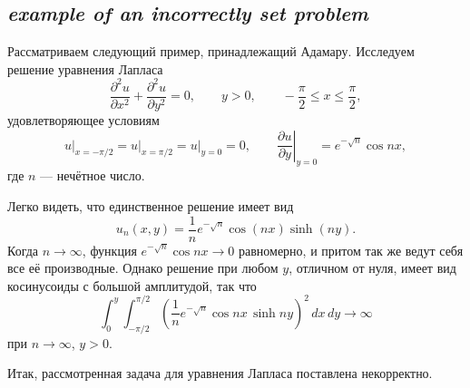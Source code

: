 \subsection*{ \textit{example of an incorrectly set problem}}
\begin{rusblock}
Рассматриваем следующий пример, принадлежащий Адамару. Исследуем решение уравнения Лапласа
\[
\frac{\partial^2u}{\partial x^2}+\frac{\partial^2u}{\partial y^2}=0,
\qquad y>0,
\qquad -\frac{\pi}{2}\le x\le\frac{\pi}{2},
\]
удовлетворяющее условиям
\[
u\big|_{x=-\pi/2}=u\big|_{x=\pi/2}=u\big|_{y=0}=0,
\qquad
\left.\frac{\partial u}{\partial y}\right|_{y=0}=e^{-\sqrt n}\cos nx,
\]
где $n$ --- нечётное число.

Легко видеть, что единственное решение имеет вид
\[
u_n(x,y)=\frac1n e^{-\sqrt n}\cos(nx)\sinh(ny).
\]
Когда $n\to\infty$, функция $e^{-\sqrt n}\cos nx\to0$ равномерно, и притом так же ведут себя все её производные. Однако решение при любом $y$, отличном от нуля, имеет вид косинусоиды с большой амплитудой, так что
\[
\int_0^y\int_{-\pi/2}^{\pi/2}
\left(\frac1n e^{-\sqrt n}\cos nx\,\sinh ny\right)^2\,dx\,dy\longrightarrow\infty
\]
при $n\to\infty$, $y>0$.

Итак, рассмотренная задача для уравнения Лапласа поставлена некорректно.
\end{rusblock}


